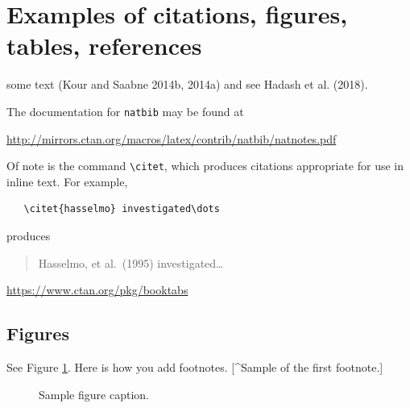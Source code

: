 \documentclass{article}
\newenvironment{Shaded}{\begin{snugshade}}{\end{snugshade}}
\newcommand{\FunctionTok}[1]{\textcolor[rgb]{0.00,0.00,0.00}{#1}}
\newcommand{\NormalTok}[1]{#1}
\newcommand{\SpecialCharTok}[1]{\textcolor[rgb]{0.00,0.00,0.00}{#1}}
\begin{document}
\hypertarget{examples-of-citations-figures-tables-references}{%
\section{Examples of citations, figures, tables,
references}\label{examples-of-citations-figures-tables-references}}

\label{sec:others}

\lipsum[8] some text (Kour and Saabne 2014b, 2014a) and see Hadash et
al. (2018).

The documentation for \verb+natbib+ may be found at

\begin{center}
  \url{http://mirrors.ctan.org/macros/latex/contrib/natbib/natnotes.pdf}
\end{center}

Of note is the command \verb+\citet+, which produces citations
appropriate for use in inline text. For example,

\begin{verbatim}
   \citet{hasselmo} investigated\dots
\end{verbatim}

produces

\begin{quote}
  Hasselmo, et al.\ (1995) investigated\dots
\end{quote}

\begin{center}
  \url{https://www.ctan.org/pkg/booktabs}
\end{center}

\hypertarget{figures}{%
\subsection{Figures}\label{figures}}

\lipsum[10] See Figure \ref{fig:fig1}. Here is how you add footnotes.
{[}\^{}Sample of the first footnote.{]}

\lipsum[11]

\begin{figure}
  \centering
  \fbox{\rule[-.5cm]{4cm}{4cm} \rule[-.5cm]{4cm}{0cm}}
  \caption{Sample figure caption.}
  \label{fig:fig1}
\end{figure}

\begin{Shaded}
\end{Shaded}
\end{document}
